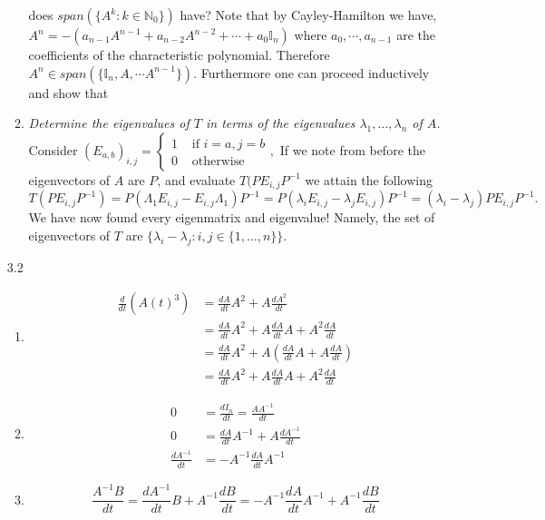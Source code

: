 \documentclass[12pt, letterpaper]{article}
\newcommand{\N}{\mathbb{N}}
\begin{document}
\begin{enumerate}
\begin{enumerate}
	does $span(\{A^k : k \in \N_0\})$ have?  Note that by Cayley-Hamilton
	we have, $A^n = -(a_{n-1}A^{n-1} + a_{n-2}A^{n-2} + \cdots + a_0 \mathbb{I}_n)$ where $a_0,\cdots,a_{n-1}$ are the coefficients of the characteristic polynomial.  Therefore $A^n \in span(\{\mathbb{I}_n,A,\cdots A^{n-1}\})$.  Furthermore one can proceed inductively and show that 
	\fi
	\item \textit{Determine the eigenvalues of $T$ in terms of the eigenvalues $\lambda_1,\ldots , \lambda_n$ of $A$.}\\
	Consider $(E_{a,b})_{i,j} = \begin{cases} 1 & \text{ if } i = a, j=b\\
	0 & \text{ otherwise }   \end{cases},$  If we note from before the 
	eigenvectors of $A$ are $P$, and evaluate $T(PE_{i,j}P^{-1}$ we attain the following $$
	T(PE_{i,j}P^{-1}) = P( \Lambda_1 E_{i,j} - E_{i,j}\Lambda_1) P^{-1}
	= P(\lambda_i E_{i,j} - \lambda_j E_{i,j})P^{-1} = 
	(\lambda_i - \lambda_j)P E_{i,j} P^{-1}.  
	$$
	We have now found every eigenmatrix and eigenvalue!  Namely, the 
	set of eigenvectors of $T$ are $\{\lambda_i - \lambda_j: i,j \in \{1,\ldots,n\}\}$.
	\end{enumerate}
	\item[3.2]
	\begin{enumerate}
		\item \begin{align*}
		\frac{d}{dt}(A(t)^3) &= \frac{dA}{dt}A^2 + A\frac{dA^2}{dt}\\
			&= \frac{dA}{dt} A^2 + A\frac{dA}{dt}A + A^2\frac{dA}{dt}\\
			&= \frac{dA}{dt} A^2 + A(\frac{dA}{dt}A + A\frac{dA}{dt})\\
			&= \frac{dA}{dt} A^2 + A\frac{dA}{dt}A + A^2\frac{dA}{dt}
 		\end{align*}
		\item 
		\begin{align*}
			0 &= \frac{dI_n}{dt} = \frac{AA^{-1}}{dt}\\
			0 &= \frac{dA}{dt}A^{-1} + A\frac{dA^{-1}}{dt}\\
			\frac{dA^{-1}}{dt} &= -A^{-1} \frac{dA}{dt} A^{-1}
		\end{align*}
		\item $$
		\frac{A^{-1}B}{dt} = \frac{dA^{-1}}{dt}B + A^{-1} \frac{dB}{dt}
		= -A^{-1} \frac{dA}{dt} A^{-1} + A^{-1} \frac{dB}{dt}
		$$
		

\end{enumerate}
\end{enumerate}
\end{document}
